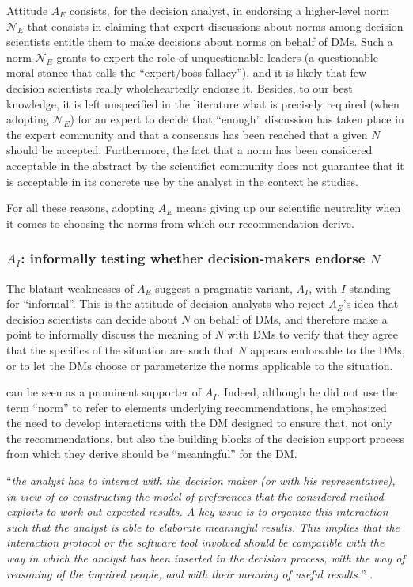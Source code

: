 \documentclass[preprint, french, english, 11pt, authoryear]{elsarticle}%
\newcommand{\protectforpdf}[1]{\texorpdfstring{\ensuremath{#1}}{#1}}
\begin{document}
Attitude $A_E$ consists, for the decision analyst, in endorsing a higher-level norm $\mathscr{N}_E$ that consists in claiming that expert discussions about norms among decision scientists entitle them to make decisions about norms on behalf of \acp{DM}. Such a norm $\mathscr{N}_E$ grants to expert the role of unquestionable leaders (a questionable moral stance that \citet{estlund_democratic_2009} calls the ``expert/boss fallacy''), and it is likely that few decision scientists really wholeheartedly endorse it. Besides, to our best knowledge, it is left unspecified in the literature what is precisely required (when adopting  $\mathscr{N}_E$) for an expert to decide that “enough” discussion has taken place in the expert community and that a consensus has been reached that a given $N$ should be accepted. Furthermore, the fact that a norm has been considered acceptable in the abstract by the scientifict community does not guarantee that it is acceptable in its concrete use by the analyst in the context he studies.

For all these reasons, adopting $A_E$ means giving up our scientific neutrality when it comes to choosing the norms from which our recommendation derive. 

\subsubsection{\texorpdfstring{$A_I$}{AI}: informally testing whether decision-makers endorse \protectforpdf{N}}
The blatant weaknesses of $A_E$ suggest a pragmatic variant, $A_I$, with $I$ standing for “informal”. This is the attitude of decision analysts who reject $A_E$'s idea that decision scientists can decide about $N$ on behalf of \acp{DM}, and therefore make a point to informally discuss the meaning of $N$ with \acp{DM} to verify that they agree that the specifics of the situation are such that $N$ appears endorsable to the \acp{DM}, or to let the \acp{DM} choose or parameterize the norms applicable to the situation.

\citet{roy_multicriteria_1996} can be seen as a prominent supporter of $A_I$. Indeed, although he did not use the term “norm” to refer to elements underlying recommendations, he emphasized the need to develop interactions with the \ac{DM} designed to ensure that, not only the recommendations, but also the building blocks of the decision support process from which they derive should be ``meaningful'' for the \ac{DM}.
\begin{addmargin}[3em]{3em}
 “\emph{the analyst has to interact
with the decision maker (or with his representative), in view of co-constructing the model of preferences that the considered method exploits to work out expected results. A key issue is to organize this interaction such that the analyst is able to
elaborate meaningful results. This implies that the interaction protocol or the
software tool involved should be compatible with the way in which the analyst has
been inserted in the decision process, with the way of reasoning of the inquired
people, and with their meaning of useful results.}” \citep[pp. 84--85]{roy_questions_2013}.
\end{addmargin}
\end{document}
